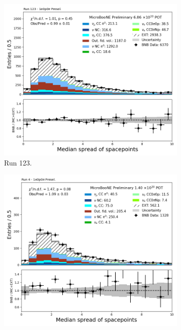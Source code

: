 \begin{figure}[H]
    \centering
    \begin{subfigure}[t]{0.32\linewidth}
        \includegraphics[width=\linewidth]{technote/Appendix_Preselection/Figures/1e0p0pi/Run123/DeltaRMS2h_Run123_1e0p0pi_Presel.png}
        \caption{Run 123.}
    \end{subfigure}%
    \hspace{0.2cm}%
    \begin{subfigure}[t]{0.32\linewidth}
        \includegraphics[width=\linewidth]{technote/Appendix_Preselection/Figures/1e0p0pi/Run4b/DeltaRMS2h_Run4b_1e0p0pi_Presel.png}

\end{subfigure}
\end{figure}
